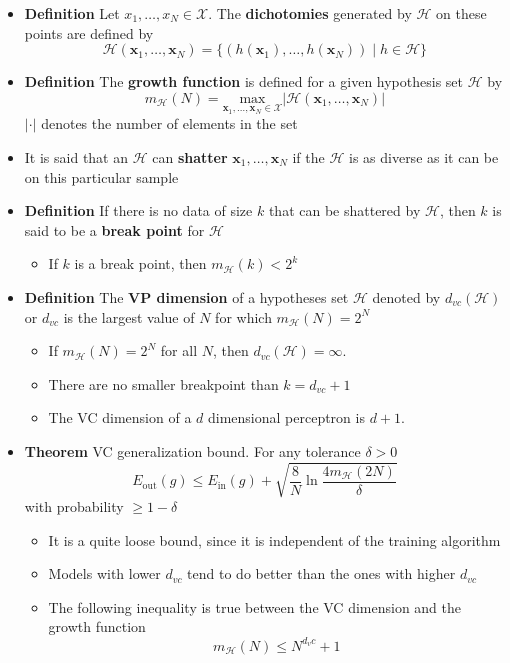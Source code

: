 \documentclass[a4, english]{article}
\begin{document}
\begin{itemize}
\begin{itemize}
  \end{itemize}
  \item \textbf{Definition} Let $x_1, \dots, x_N \in \mathcal X$. The \textbf{dichotomies} generated by $\mathcal H$ on these points are defined by
\begin{equation*}
  \mathcal H (\pmb x_1, \dots, \pmb x_N )= \{ (h(\pmb x_1), \dots, h(\pmb x_N )) \mid h \in \mathcal H \} 
\end{equation*}
  \item \textbf{Definition} The \textbf{growth function} is defined for a given hypothesis set $\mathcal H$ by 
\begin{equation*}
  m_\mathcal{H}(N) = \underset{\pmb x_1, \dots, \pmb x_N \in \mathcal X}{\text{max}} | \mathcal H(\pmb x_1, \dots, \pmb x_N)|
\end{equation*}
 $| \cdot |$ denotes the number of elements in the set 
  \item It is said that an $\mathcal H$ can \textbf{shatter} $\pmb x_1, \dots, \pmb x_N$  if the $\mathcal H$ is as diverse as it can be on this particular sample
  \item \textbf{Definition} If there is no data of size $k$ that can be shattered by $\mathcal H$, then $k$ is said to be a \textbf{break point} for $\mathcal H$ 
  \begin{itemize}
  	\item If $k$ is a break point, then $m_{\mathcal H}(k)<2^k$ 
  \end{itemize}
  \item \textbf{Definition} The \textbf{VP dimension} of a hypotheses set $\mathcal H$ denoted by $d_{vc}(\mathcal H)$ or $d_{vc}$ is the largest value of $N$ for which $m_{\mathcal H}(N)=2^N$
  \begin{itemize}
  	\item If $m_\mathcal H (N) = 2^N$ for all $N$, then $d_{vc}(\mathcal H) = \infty$.
    \item There are no smaller breakpoint than $k=d_{vc}+1$ 
    \item The VC dimension of a $d$ dimensional perceptron is $d+1$. 
  \end{itemize}
  \item \textbf{Theorem} VC generalization bound. For any tolerance $\delta > 0$ 
\begin{equation*}
  E_\text{out}(g) \leq E_\text{in}(g) + \sqrt{\frac8N\ln\frac{4m_\mathcal{H}(2N)}\delta}
\end{equation*}
with probability $\geq 1- \delta$  
  \begin{itemize}
  	\item It is a quite loose bound, since it is independent of the training algorithm
    \item Models with lower $d_{vc}$ tend to do better than the ones with higher $d_{vc}$
    \item The following inequality is true between the VC dimension and the growth function
\begin{equation*}
  m_{\mathcal H}(N) \leq N^{d_vc}+1
\end{equation*}


\end{itemize}
\end{itemize}
\end{document}
